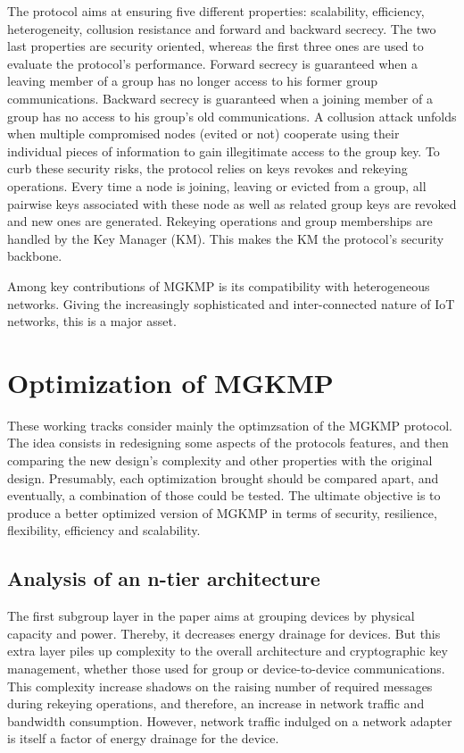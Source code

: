 The protocol aims at ensuring five different properties: scalability, efficiency, heterogeneity, collusion resistance and forward and backward secrecy. The two last properties are security oriented, whereas the first three ones are used to evaluate the protocol's performance. Forward secrecy is guaranteed when a leaving member of a group has no longer access to his former group communications. Backward secrecy is guaranteed when a joining member of a group has no access to his group's old communications. A collusion attack unfolds when multiple compromised nodes (evited or not) cooperate using their individual pieces of information to gain illegitimate access to the group key. To curb these security risks, the protocol relies on keys revokes and rekeying operations. Every time a node is joining, leaving or evicted from a group, all pairwise keys associated with these node as well as related group keys are revoked and new ones are generated. Rekeying operations and group memberships are handled by the Key Manager (KM). This makes the KM the protocol's security backbone.

Among key contributions of MGKMP is its compatibility with heterogeneous networks. Giving the increasingly sophisticated and inter-connected nature of IoT networks, this is a major asset.

\section{Optimization of MGKMP}
\label{sec:mgkmp_optimization}

These working tracks consider mainly the optimzsation of the MGKMP protocol. The idea consists in redesigning some aspects of the protocols features, and then comparing the new design’s complexity and other properties with the original design. Presumably, each optimization brought should be compared apart, and eventually, a combination of those could be tested. The ultimate objective is to produce a better optimized version of MGKMP in terms of security, resilience, flexibility, efficiency and scalability.

\subsection{Analysis of an n-tier architecture}
\label{subsec:n-tier}

The first subgroup layer in the paper aims at grouping devices by physical capacity and power. Thereby, it decreases energy drainage for devices. But this extra layer piles up complexity to the overall architecture and cryptographic key management, whether those used for group or device-to-device communications. This complexity increase shadows on the raising number of required messages during rekeying operations, and therefore, an increase in network traffic and bandwidth consumption. However, network traffic indulged on a network adapter is itself a factor of energy drainage for the device.

